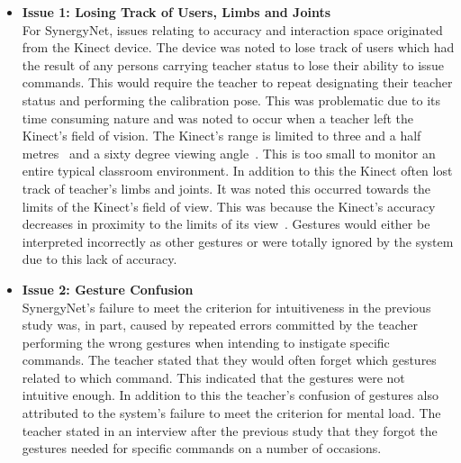 \documentclass[link]{IWCOMP}
\begin{document}
\begin{itemize}

\item \textbf{Issue 1: Losing Track of Users, Limbs and Joints}\\
For SynergyNet, issues relating to accuracy and interaction space originated from the Kinect device.
The device was noted to lose track of users which had the result of any persons carrying teacher status to lose their ability to issue commands.
This would require the teacher to repeat designating their teacher status and performing the calibration pose.
This was problematic due to its time consuming nature and was noted to occur when a teacher left the Kinect's field of vision.
The Kinect's range is limited to three and a half metres~\cite{Maimone2011} and a sixty degree viewing angle~\cite{Stone2011}.
This is too small to monitor an entire typical classroom environment.
In addition to this the Kinect often lost track of teacher's limbs and joints.
It was noted this occurred towards the limits of the Kinect's field of view.
This was because the Kinect's accuracy decreases in proximity to the limits of its view~\cite{Mehrotra2011}.
Gestures would either be interpreted incorrectly as other gestures or were totally ignored by the system due to this lack of accuracy.

\item \textbf{Issue 2: Gesture Confusion}\\
SynergyNet's failure to meet the criterion for intuitiveness in the previous study was, in part, caused by repeated errors committed by the teacher performing the wrong gestures when intending to instigate specific commands.
The teacher stated that they would often forget which gestures related to which command.
This indicated that the gestures were not intuitive enough.
In addition to this the teacher's confusion of gestures also attributed to the system's failure to meet the criterion for mental load.
The teacher stated in an interview after the previous study that they forgot the gestures needed for specific commands on a number of occasions.


\end{itemize}
\end{document}
